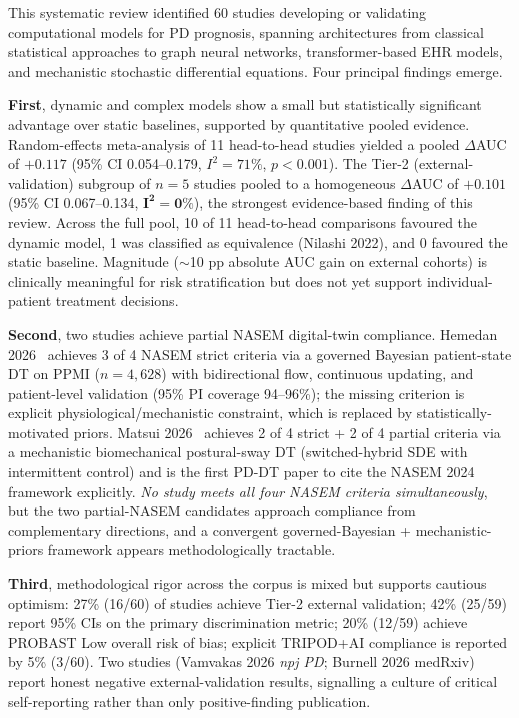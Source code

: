 This systematic review identified 60 studies developing or validating computational models for PD prognosis, spanning architectures from classical statistical approaches to graph neural networks, transformer-based EHR models, and mechanistic stochastic differential equations. Four principal findings emerge.

\textbf{First}, dynamic and complex models show a small but statistically significant advantage over static baselines, supported by quantitative pooled evidence. Random-effects meta-analysis of 11 head-to-head studies yielded a pooled $\Delta$AUC of $+0.117$ (95\% CI 0.054--0.179, $I^2 = 71\%$, $p < 0.001$). The Tier-2 (external-validation) subgroup of $n=5$ studies pooled to a homogeneous $\Delta$AUC of $+0.101$ (95\% CI 0.067--0.134, $\boldsymbol{I^2 = 0\%}$), the strongest evidence-based finding of this review. Across the full pool, 10 of 11 head-to-head comparisons favoured the dynamic model, 1 was classified as equivalence (Nilashi 2022), and 0 favoured the static baseline. Magnitude ($\sim$10 pp absolute AUC gain on external cohorts) is clinically meaningful for risk stratification but does not yet support individual-patient treatment decisions.

\textbf{Second}, two studies achieve partial NASEM digital-twin compliance. Hemedan 2026~\cite{hemedan2026} achieves 3 of 4 NASEM strict criteria via a governed Bayesian patient-state DT on PPMI ($n=4{,}628$) with bidirectional flow, continuous updating, and patient-level validation (95\% PI coverage 94--96\%); the missing criterion is explicit physiological/mechanistic constraint, which is replaced by statistically-motivated priors. Matsui 2026~\cite{matsui2026stance} achieves 2 of 4 strict + 2 of 4 partial criteria via a mechanistic biomechanical postural-sway DT (switched-hybrid SDE with intermittent control) and is the first PD-DT paper to cite the NASEM 2024 framework explicitly. \emph{No study meets all four NASEM criteria simultaneously}, but the two partial-NASEM candidates approach compliance from complementary directions, and a convergent governed-Bayesian + mechanistic-priors framework appears methodologically tractable.

\textbf{Third}, methodological rigor across the corpus is mixed but supports cautious optimism: 27\% (16/60) of studies achieve Tier-2 external validation; 42\% (25/59) report 95\% CIs on the primary discrimination metric; 20\% (12/59) achieve PROBAST Low overall risk of bias; explicit TRIPOD+AI compliance is reported by 5\% (3/60). Two studies (Vamvakas 2026 \textit{npj PD}; Burnell 2026 medRxiv) report honest negative external-validation results, signalling a culture of critical self-reporting rather than only positive-finding publication.

